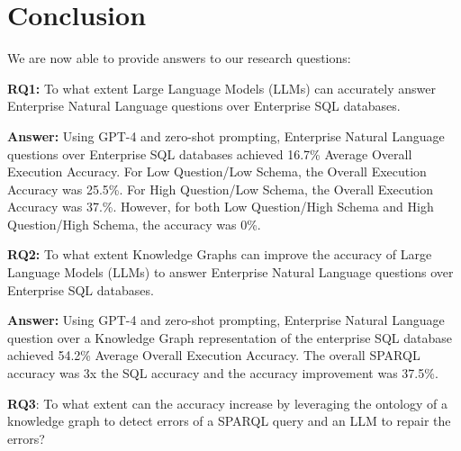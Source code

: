 \documentclass[11pt]{article}
\begin{document}
\section{Conclusion}
We are now able to provide answers to our research questions:

\noindent\textbf{RQ1:} To what extent Large Language Models (LLMs) can accurately answer Enterprise Natural Language questions over Enterprise SQL databases. 

\textbf{Answer:} Using GPT-4 and zero-shot prompting, Enterprise Natural Language questions over Enterprise SQL databases achieved 16.7\% Average Overall Execution Accuracy. For Low Question/Low Schema, the Overall Execution Accuracy was 25.5\%. For High Question/Low Schema, the Overall Execution Accuracy was 37.\%. However, for both Low Question/High Schema and High Question/High Schema, the accuracy was 0\%.

\noindent\textbf{RQ2:} To what extent Knowledge Graphs can improve the accuracy of Large Language Models (LLMs) to answer Enterprise Natural Language questions over Enterprise SQL databases. 

\textbf{Answer:} Using GPT-4 and zero-shot prompting, Enterprise Natural Language question over a Knowledge Graph representation of the enterprise SQL database achieved 54.2\% Average Overall Execution Accuracy. 
The overall SPARQL accuracy was 3x the SQL accuracy and the accuracy improvement was 37.5\%. 


\noindent\textbf{RQ3}: To what extent can the accuracy increase by leveraging the ontology of a knowledge graph to detect errors of a SPARQL query and an LLM to repair the errors?
\end{document}
